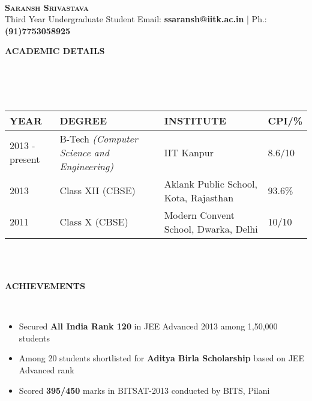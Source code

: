 \documentclass[a4paper,10pt]{article}
\newcommand{\isep}{-2 pt}
\newcommand{\lsep}{-0.5cm}
\newcommand{\resheading}[1]{{\small \colorbox{mygrey}{\begin{minipage}{0.975\textwidth}{\textbf{#1 \vphantom{p\^{E}}}}\end{minipage}}}}
\begin{document}
\hspace{0.5cm}\\[-0.2cm]

\textbf{\Huge \textsc{Saransh Srivastava}}\\
\indent Third Year Undergraduate Student\hfill
Email: \textbf{ssaransh@iitk.ac.in} |
Ph.: \textbf{(91)7753058925} \\

\resheading{\textbf{ACADEMIC DETAILS} }\\[\lsep]
\\ \\
\indent \begin{tabular}{ L{3cm} L{7cm} L{8cm} L{1.2cm} }
\hline
\textbf{YEAR} & \textbf{DEGREE} & \textbf{INSTITUTE}  & \textbf{CPI/\%} \\
\hline

2013 - present & B-Tech \emph{(Computer Science and Engineering)} & IIT Kanpur & 8.6/10 \\
2013 & Class XII (CBSE) & Aklank Public School, Kota, Rajasthan  & 93.6\% \\
2011 & Class X (CBSE) & Modern Convent School, Dwarka, Delhi & 10/10 \\
\hline
\end{tabular}
\\ \\


\resheading{\textbf{ACHIEVEMENTS} }\\[\lsep]
\begin{itemize}\itemsep \isep
\item \noindent Secured \textbf{All India Rank 120} in JEE Advanced 2013 among 1,50,000 students
\item \noindent Among 20 students shortlisted for \textbf{Aditya Birla Scholarship} based on JEE Advanced rank
\item \noindent Scored \textbf{395/450} marks in BITSAT-2013 conducted by BITS, Pilani
\end{itemize}
\end{document}
